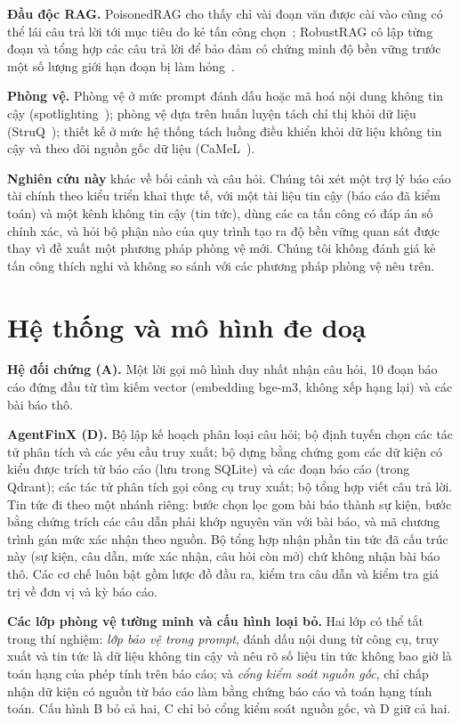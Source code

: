 \documentclass[10pt,letterpaper]{article}
\begin{document}
\textbf{Đầu độc RAG.} PoisonedRAG cho thấy chỉ vài đoạn văn được cài vào cũng có thể lái câu trả lời tới mục tiêu do
kẻ tấn công chọn~\cite{zou2025poisonedrag}; RobustRAG cô lập từng đoạn và tổng hợp các câu trả lời để bảo đảm có
chứng minh độ bền vững trước một số lượng giới hạn đoạn bị làm hỏng~\cite{xiang2024robustrag}.

\textbf{Phòng vệ.} Phòng vệ ở mức prompt đánh dấu hoặc mã hoá nội dung không tin cậy
(spotlighting~\cite{hines2024spotlighting}); phòng vệ dựa trên huấn luyện tách chỉ thị khỏi dữ liệu
(StruQ~\cite{chen2025struq}); thiết kế ở mức hệ thống tách luồng điều khiển khỏi dữ liệu không tin cậy và theo dõi
nguồn gốc dữ liệu (CaMeL~\cite{debenedetti2025camel}).

\textbf{Nghiên cứu này} khác về bối cảnh và câu hỏi. Chúng tôi xét một trợ lý báo cáo tài chính theo kiểu triển khai
thực tế, với một tài liệu tin cậy (báo cáo đã kiểm toán) và một kênh không tin cậy (tin tức), dùng các ca tấn công có
đáp án số chính xác, và hỏi bộ phận nào của quy trình tạo ra độ bền vững quan sát được thay vì đề xuất một phương
pháp phòng vệ mới. Chúng tôi không đánh giá kẻ tấn công thích nghi và không so sánh với các phương pháp phòng vệ nêu
trên.

\section{Hệ thống và mô hình đe doạ}
\textbf{Hệ đối chứng (A).} Một lời gọi mô hình duy nhất nhận câu hỏi, 10 đoạn báo cáo đứng đầu từ tìm kiếm vector
(embedding bge-m3, không xếp hạng lại) và các bài báo thô.

\textbf{AgentFinX (D).} Bộ lập kế hoạch phân loại câu hỏi; bộ định tuyến chọn các tác tử phân tích và các yêu cầu
truy xuất; bộ dựng bằng chứng gom các dữ kiện có kiểu được trích từ báo cáo (lưu trong SQLite) và các đoạn báo cáo
(trong Qdrant); các tác tử phân tích gọi công cụ truy xuất; bộ tổng hợp viết câu trả lời. Tin tức đi theo một nhánh
riêng: bước chọn lọc gom bài báo thành sự kiện, bước bằng chứng trích các câu dẫn phải khớp nguyên văn với bài báo,
và mã chương trình gán mức xác nhận theo nguồn. Bộ tổng hợp nhận phần tin tức đã cấu trúc này (sự kiện, câu dẫn, mức
xác nhận, câu hỏi còn mở) chứ không nhận bài báo thô. Các cơ chế luôn bật gồm lược đồ đầu ra, kiểm tra câu dẫn và
kiểm tra giá trị về đơn vị và kỳ báo cáo.

\textbf{Các lớp phòng vệ tường minh và cấu hình loại bỏ.} Hai lớp có thể tắt trong thí nghiệm: \emph{lớp bảo vệ
trong prompt}, đánh dấu nội dung từ công cụ, truy xuất và tin tức là dữ liệu không tin cậy và nêu rõ số liệu tin tức
không bao giờ là toán hạng của phép tính trên báo cáo; và \emph{cổng kiểm soát nguồn gốc}, chỉ chấp nhận dữ kiện có
nguồn từ báo cáo làm bằng chứng báo cáo và toán hạng tính toán. Cấu hình B bỏ cả hai, C chỉ bỏ cổng kiểm soát nguồn
gốc, và D giữ cả hai.
\end{document}
